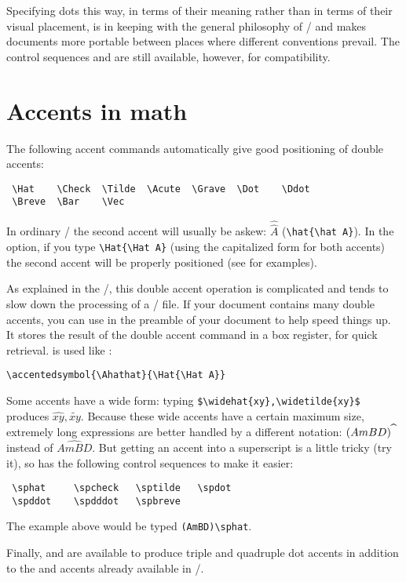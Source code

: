 Specifying dots this way, in terms of their meaning rather than in terms
of their visual placement, is in keeping with the general philosophy of
\latex/ and makes documents more portable between places where different
conventions prevail.  The control sequences  and 
are still available, however, for compatibility.

\section{Accents in math}

The following accent commands automatically
give good positioning of double accents:
\begin{verbatim}
 \Hat    \Check  \Tilde  \Acute  \Grave  \Dot    \Ddot
 \Breve  \Bar    \Vec
\end{verbatim}
In ordinary \latex/ the second
accent will usually be askew:
$\hat{\hat A}$ (\verb"\hat{\hat A}").
In the  option, if you type \verb"\Hat"\5\verb"{\Hat A}"
(using the capitalized form for both accents) the second accent
will be properly positioned (see  for examples).

As explained in the \jt/, this double accent operation is complicated
and tends to slow down the processing of a \tex/ file.
If your document contains many double accents, you can
use  in the preamble of your document to
help speed things up.  It stores the result of the double accent
command in a box register, for quick retrieval.  
is used like :
\begin{verbatim}
\accentedsymbol{\Ahathat}{\Hat{\Hat A}}
\end{verbatim}

Some accents have a wide form: typing \verb"$\widehat{xy},\widetilde{xy}$"
produces $\widehat{xy},\widetilde{xy}$.  Because these wide accents
have a certain maximum size, extremely long expressions are better
handled by a different notation:
$(AmBD)^{\widehat{\hphantom{x}}}$ instead of $\widehat{AmBD}$.  But getting
an accent into a superscript is a little tricky (try it),
so  has the following control sequences
to make it easier:
\begin{verbatim}
 \sphat     \spcheck   \sptilde   \spdot
 \spddot    \spdddot   \spbreve
\end{verbatim}
The example above would be typed \verb"(AmBD)\sphat".

Finally,  and  are available to
produce triple and quadruple dot accents
in addition to the  and  accents already available
in \latex/.

